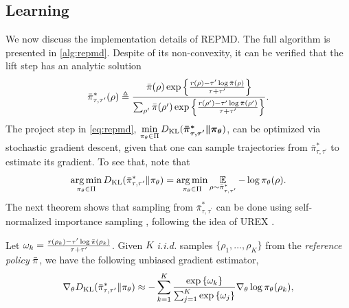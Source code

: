 \subsection{Learning}
\label{subsec:learning}
We now discuss the implementation details of REPMD. The full algorithm is presented in \cref{alg:repmd}.
Despite of its non-convexity, it can be verified that the lift step has an analytic solution
\begin{equation}
\label{eq:pitautauprime}
\bar{\pi}_{\tau,\tau^{\prime}}^*(\rho) \triangleq \frac{\bar{\pi}(\rho) \exp\left\{ \frac{r(\rho)-\tau^{\prime} \log \bar{\pi}(\rho) }{ \tau+\tau^{\prime}} \right\}}{ \sum_{\rho^{\prime}}{\bar{\pi}(\rho^{\prime}) \exp\left\{ \frac{r(\rho^{\prime})-\tau^{\prime} \log \bar{\pi}(\rho^{\prime})}{ \tau+\tau^{\prime}} \right\} } }.
\end{equation}
The project step in \cref{eq:repmd}, $\min\limits_{\pi_\theta \in \Pi}{D_{\mathrm{KL}}(\bm{ \bar{\pi}_{\tau,\tau^{\prime}}^* \| \pi_\theta }) }$, can be optimized via stochastic gradient descent, given that one can sample trajectories from $\bar{\pi}_{\tau,\tau^{\prime}}^*$ to estimate its gradient.
To see that, note that 
\begin{equation*}
\operatorname*{arg\,min}\limits_{\pi_\theta \in \Pi}D_{\mathrm{KL}}(\bar{\pi}_{\tau,\tau^{\prime}}^* \| \pi_\theta) = \operatorname*{arg\,min}\limits_{\pi_\theta \in \Pi} \operatorname*{\mathbb{E}}_{\rho \sim \bar{\pi}_{\tau,\tau^{\prime}}^* }  - \log \pi_\theta(\rho).
\end{equation*}
The next theorem shows that sampling from $\bar{\pi}_{\tau,\tau^{\prime}}^*$ can be done using self-normalized importance sampling \citep{owen2013monte}, following the idea of UREX \citep{nachum2017improving}.
\begin{thm}
\label{thm:repmdgradientestimate}
Let $\omega_k = \frac{r(\rho_k) - \tau^{\prime} \log{\bar{\pi}(\rho_k)} }{\tau + \tau^{\prime}}$. Given $K$ \emph{i.i.d.} samples $\{\rho_1, \dots, \rho_K\}$ from the \emph{reference policy} $\bar{\pi}$, we have the following unbiased gradient estimator,
\begin{equation}
\label{eq:gradient_estimator}
	\nabla_{\theta} D_{\mathrm{KL}}(\bar{\pi}_{\tau,\tau^{\prime}}^* \| \pi_\theta)\approx -\sum\limits_{k=1}^K{ \frac{ \exp\left\{ \omega_k \right\} }{ \sum_{j=1}^K{ \exp\left\{ \omega_j \right\}}} \nabla_{\theta} \log{\pi_\theta(\rho_k)} },
\end{equation}
\end{thm}

